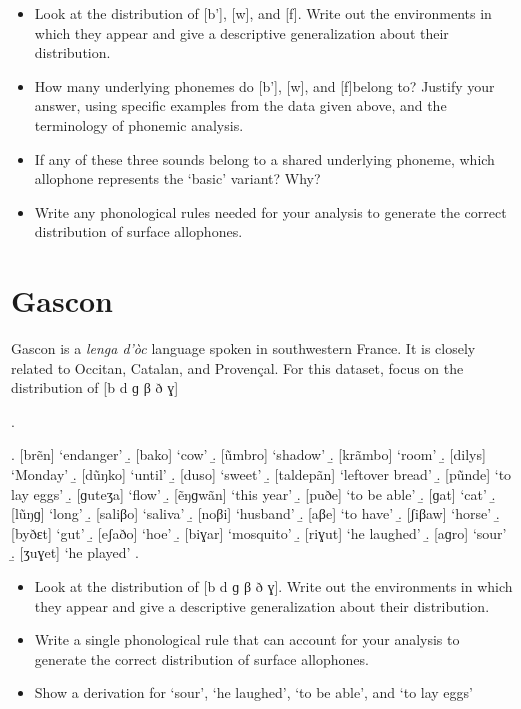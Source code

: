 \documentclass[12pt, letterpaper]{article}
\begin{document}
\begin{itemize}
    \item Look at the distribution of [b’], [w], and [f]. Write out the environments in which they appear and give a descriptive generalization about their distribution.
    \vspace{2cm}
    \item How many underlying phonemes do [b’], [w], and [f]belong to? Justify your answer, using specific examples from the data given above, and the terminology of phonemic analysis.
    \vspace{2cm}
    \item If any of these three sounds belong to a shared underlying phoneme, which allophone represents the `basic’ variant? Why?
    \vspace{2cm}
    \item Write any phonological rules needed for your analysis to generate the correct distribution of surface allophones.
\end{itemize}
\newpage

\section*{Gascon} \label{sec:gascon}

Gascon is a \textit{lenga d'òc} language spoken in southwestern France. It is closely related to Occitan, Catalan, and Provençal. For this dataset, focus on the distribution of [b d ɡ β ð ɣ] 

\ex. 
\begin{multicols}{2}
    \a. [brẽn] `endanger'
    \b. [bako] `cow'
    \b. [ũmbro] `shadow'
    \b. [krãmbo] `room'
    \b. [dilys] `Monday'
    \b. [dũŋko] `until'
    \b. [duso] `sweet'
    \b. [taldepãn] `leftover bread'
    \b. [pũnde] `to lay eggs'
    \b. [ɡuteʒa] `flow'
    \b. [ẽŋɡwãn] `this year'
    \b. [puðe] `to be able'
    \b. [ɡat] `cat'
    \b. [lũŋɡ] `long'
    \b. [saliβo] `saliva'
    \b. [noβi] `husband'
    \b. [aβe] `to have'
    \b. [ʃiβaw] `horse'
    \b. [byðɛt] `gut'
    \b. [eʃaðo] `hoe'
    \b. [biɣar] `mosquito'
    \b. [riɣut] `he laughed'
    \b. [aɡro] `sour'
    \b. [ʒuɣet] `he played'
    \z. 
\end{multicols}

\begin{itemize}
    \item Look at the distribution of [b d ɡ β ð ɣ]. Write out the environments in which they appear and give a descriptive generalization about their distribution. 
    \vspace{4cm}
    \item Write a single phonological rule that can account for your analysis to generate the correct distribution of surface allophones.
    \vspace{2cm}
    \item Show a derivation for `sour', `he laughed', `to be able', and `to lay eggs'
\end{itemize}
\end{document}
